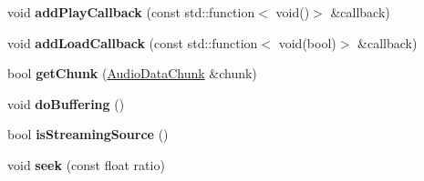 \begin{DoxyCompactItemize}
void {\bfseries add\+Play\+Callback} (const std\+::function$<$ void()$>$ \&callback)
\item 
\mbox{\label{classexperimental_1_1AudioCache_aee69363d9da3b0a4ee1f3c2360516195}} 
void {\bfseries add\+Load\+Callback} (const std\+::function$<$ void(bool)$>$ \&callback)
\item 
\mbox{\label{classexperimental_1_1AudioCache_ab1e6c05b2b9a212a2d1df411d734abe1}} 
bool {\bfseries get\+Chunk} (\hyperlink{structexperimental_1_1AudioDataChunk}{Audio\+Data\+Chunk} \&chunk)
\item 
\mbox{\label{classexperimental_1_1AudioCache_a2b034905c416f04e430adac9c69609e2}} 
void {\bfseries do\+Buffering} ()
\item 
\mbox{\label{classexperimental_1_1AudioCache_ae9997dcfb8be0eeb6879b2513395fb06}} 
bool {\bfseries is\+Streaming\+Source} ()
\item 
\mbox{\label{classexperimental_1_1AudioCache_a2db9a31be81eed589c2fc4409ada9a8c}} 
void {\bfseries seek} (const float ratio)
\end{DoxyCompactItemize}
